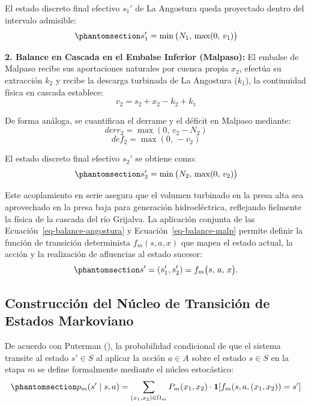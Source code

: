 \documentclass[
  spanish,
  letterpaper,
]{scrreprt}
\theoremstyle{definition}
\theoremstyle{remark}
\begin{document}
El estado discreto final efectivo \(s_{1}'\) de La Angostura queda
proyectado dentro del intervalo admisible:
\begin{equation}\protect\phantomsection\label{eq-balance-angostura}{s_{1}' = \min\big(N_1, \, \max(0, \, v_1)\big)}\end{equation}

\textbf{2. Balance en Cascada en el Embalse Inferior (Malpaso):} El
embalse de Malpaso recibe sus aportaciones naturales por cuenca propia
\(x_2\), efectúa su extracción \(k_2\) y recibe la descarga turbinada de
La Angostura (\(k_1\)), la continuidad física en cascada establece:
\[v_2 = s_2 + x_2 - k_2 + k_1\]

De forma análoga, se cuantifican el derrame y el déficit en Malpaso
mediante: \[derr_2 = \max(0, \, v_2 - N_2)\]
\[def_2 = \max(0, \, -v_2)\]

El estado discreto final efectivo \(s_{2}'\) se obtiene como:
\begin{equation}\protect\phantomsection\label{eq-balance-malp}{s_{2}' = \min\big(N_2, \, \max(0, \, v_2)\big)}\end{equation}

Este acoplamiento en serie asegura que el volumen turbinado en la presa
alta sea aprovechado en la presa baja para generación hidroeléctrica,
reflejando fielmente la física de la cascada del río Grijalva. La
aplicación conjunta de las Ecuación~\ref{eq-balance-angostura} y
Ecuación~\ref{eq-balance-malp} permite definir la función de transición
determinista \(f_m(s, a, x)\) que mapea el estado actual, la acción y la
realización de afluencias al estado sucesor:
\begin{equation}\protect\phantomsection\label{eq-mapeo-transicion}{
s' = (s_1', s_2') = f_m\bigl(s,\, a,\, x \bigr).
}\end{equation}

\subsection{Construcción del Núcleo de Transición de Estados
Markoviano}\label{sec-nucleo-transicion}

De acuerdo con Puterman (), la
probabilidad condicional de que el sistema transite al estado
\(s' \in S\) al aplicar la acción \(a \in A\) sobre el estado
\(s \in S\) en la etapa \(m\) se define formalmente mediante el núcleo
estocástico:
\begin{equation}\protect\phantomsection\label{eq-nucleo-markoviano}{
p_m(s' \mid s, a) = \sum_{(x_1, x_2) \in \Omega_m} P_m(x_1, x_2) \cdot \mathbf{1}\!\left[f_m(s, a, (x_1, x_2)) = s'\right] 
}\end{equation}
\end{document}
